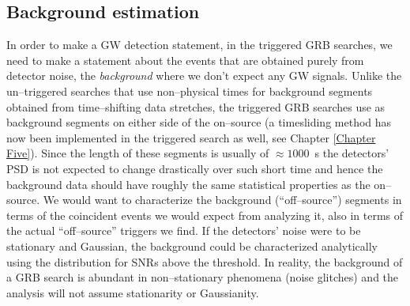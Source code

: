 \subsection{Background estimation}

In order to make a GW detection statement, in the triggered GRB searches, we need to make a statement about the events that are obtained purely from detector noise, the \emph{background} where we don't expect any GW signals. Unlike the un--triggered searches that use non--physical times for background segments obtained from time--shifting data stretches, the triggered GRB searches use as background segments on either side of the on--source (a timesliding method has now been implemented in the triggered search as well, see Chapter \ref{Chapter Five}). Since the length of these segments is usually of $\approx1000$~s the detectors' PSD is not expected to change drastically over such short time and hence the background data should have roughly the same statistical properties as the on--source. We would want to characterize the background (``off--source'') segments in terms of the coincident events we would expect from analyzing it, also in terms of the actual ``off--source'' triggers we find. If the detectors' noise were to be stationary and Gaussian, the background could be characterized analytically using the distribution for SNRs above the threshold. In reality, the background of a GRB search is abundant in non--stationary phenomena (noise glitches) and the analysis will not assume stationarity or Gaussianity.


